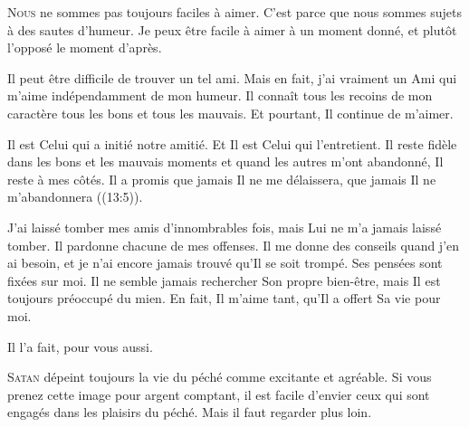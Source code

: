 \lettrine{N}{ous} ne sommes pas toujours faciles à aimer.
 C'est parce que nous sommes sujets à des sautes d'humeur.
 Je peux être facile à aimer à un moment donné,
 et plutôt l'opposé le moment d'après.


Il peut être difficile de trouver un tel ami. Mais en fait,
 j'ai vraiment un Ami qui m'aime indépendamment de mon humeur.
 Il connaît tous les recoins de mon caractère
 \ocadr tous les bons et tous les mauvais.
 Et pourtant, Il continue de m'aimer.

Il est Celui qui a initié notre amitié. Et Il est Celui qui l'entretient.
 Il reste fidèle dans les bons et les mauvais moments et quand les autres
 m'ont abandonné, Il reste à mes côtés. Il a promis que jamais
 Il ne me délaissera, que jamais Il ne m'abandonnera ((13:5)).

J'ai laissé tomber mes amis d'innombrables fois, mais Lui ne m'a jamais laissé
 tomber. Il pardonne chacune de mes offenses. Il me donne des conseils
 quand j'en ai besoin, et je n'ai encore jamais trouvé qu'Il se soit trompé.
 Ses pensées sont fixées sur moi. 
 Il ne semble jamais rechercher 
 Son propre bien-être, mais Il est toujours préoccupé du mien.
 En fait, Il m'aime tant, qu'Il a offert Sa vie pour moi.

Il l'a fait, pour vous aussi.

\dvrule







\lettrine{S}{atan} dépeint toujours la vie du péché
 comme excitante et agréable.
 Si vous prenez cette image pour argent comptant,
 il est facile d'envier ceux qui sont engagés
 dans les plaisirs du péché. Mais il faut regarder plus loin. 

